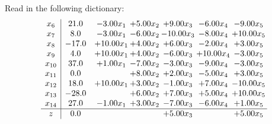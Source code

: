 \documentclass[9pt]{article}
\begin{document}
Read in the following dictionary:
\[\begin{array}{c| c c@{\hskip 2pt} c@{\hskip 2pt} c@{\hskip 2pt} c@{\hskip 2pt} c@{\hskip 2pt} }
 x_{6}   &  21.0 & -3.00 x_{1} & +  5.00 x_{2} & +  9.00 x_{3} & -6.00 x_{4} & -9.00 x_{5}\\
 x_{7}   &  8.0 & -3.00 x_{1} & -6.00 x_{2} & -10.00 x_{3} & -8.00 x_{4} & + 10.00 x_{5}\\
 x_{8}   &  -17.0 & + 10.00 x_{1} & +  4.00 x_{2} & +  6.00 x_{3} & -2.00 x_{4} & +  3.00 x_{5}\\
 x_{9}   &  4.0 & + 10.00 x_{1} & +  4.00 x_{2} & -6.00 x_{3} & + 10.00 x_{4} & -3.00 x_{5}\\
 x_{10}   &  37.0 & +  1.00 x_{1} & -7.00 x_{2} & -3.00 x_{3} & -9.00 x_{4} & -3.00 x_{5}\\
 x_{11}   &  0.0  &   & +  8.00 x_{2} & +  2.00 x_{3} & -5.00 x_{4} & +  3.00 x_{5}\\
 x_{12}   &  18.0 & + 10.00 x_{1} & +  3.00 x_{2} & -1.00 x_{3} & +  7.00 x_{4} & -10.00 x_{5}\\
 x_{13}   &  -28.0  &   & +  6.00 x_{2} & +  7.00 x_{3} & +  5.00 x_{4} & + 10.00 x_{5}\\
 x_{14}   &  27.0 & -1.00 x_{1} & +  3.00 x_{2} & -7.00 x_{3} & -6.00 x_{4} & +  1.00 x_{5}\\
\hline
z    &  0.0  &    &   & +  5.00 x_{3} &   & +  5.00 x_{5}\\
\end{array}\]
\end{document}
